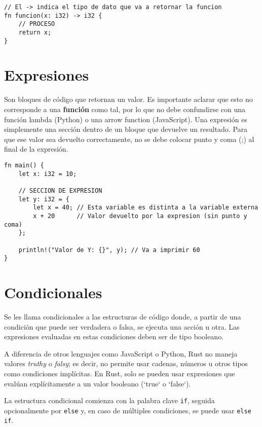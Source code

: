 \documentclass[12pt]{article}
\begin{document}
\begin{lstlisting}[style=ruststyle]
// El -> indica el tipo de dato que va a retornar la funcion
fn funcion(x: i32) -> i32 {
	// PROCESO
	return x;
}
\end{lstlisting}

	\section{Expresiones}
	Son bloques de código que retornan un valor. Es importante aclarar que esto no corresponde a una \textbf{función} como tal, por lo que no debe confundirse con una función lambda (Python) o una arrow function (JavaScript). Una expresión es simplemente una sección dentro de un bloque que devuelve un resultado. Para que ese valor sea devuelto correctamente, no se debe colocar punto y coma (;) al final de la expresión.

\begin{lstlisting}[style=ruststyle]
fn main() {
	let x: i32 = 10;

	// SECCION DE EXPRESION
	let y: i32 = {
		let x = 40; // Esta variable es distinta a la variable externa
		x + 20      // Valor devuelto por la expresion (sin punto y coma)
	};

	println!("Valor de Y: {}", y); // Va a imprimir 60
}
\end{lstlisting}




\section{Condicionales}

Se les llama condicionales a las estructuras de código donde, a partir de una condición que puede ser verdadera o falsa, se ejecuta una acción u otra. Las expresiones evaluadas en estas condiciones deben ser de tipo booleano.

A diferencia de otros lenguajes como JavaScript o Python, Rust no maneja valores \textit{truthy} o \textit{falsy}; es decir, no permite usar cadenas, números u otros tipos como condiciones implícitas. En Rust, solo se pueden usar expresiones que evalúan explícitamente a un valor booleano (`true` o `false`).

La estructura condicional comienza con la palabra clave \texttt{if}, seguida opcionalmente por \texttt{else} y, en caso de múltiples condiciones, se puede usar \texttt{else if}.
\linebreak
\end{document}
